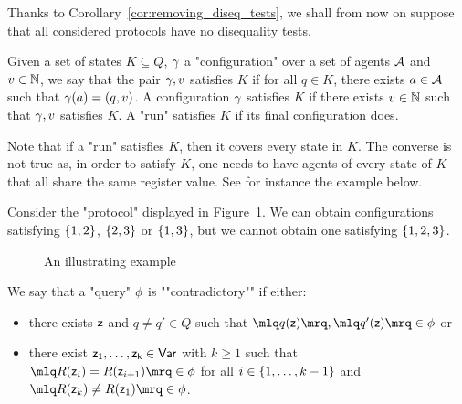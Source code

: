 Thanks to Corollary~\ref{cor:removing_diseq_tests}, we shall from now on suppose that all considered protocols have no disequality tests. 

\begin{definition}
	Given a set of states $K \subseteq Q$, $\gamma$ a "configuration" over a set of agents $\mathcal{A}$ and $v \in \mathbb{N}$, we say that the pair $\gamma, v$ satisfies $K$ if for all $q \in K$, there exists $a \in \mathcal{A}$ such that $\gamma(a) = (q,v)$.
	A configuration $\gamma$ satisfies $K$ if there exists $v \in \mathbb{N}$ such that $\gamma, v $ satisfies $K$. 
	A "run" satisfies $K$ if its final configuration does.
\end{definition}
Note that if a "run" satisfies $K$, then it covers every state in $K$. The converse is not true as, in order to satisfy $K$, one needs to have agents of every state of $K$ that all share the same register value. See for instance the example below.

\begin{ex}
	Consider the "protocol" displayed in Figure~\ref{fig:no-clique}.
	We can obtain configurations satisfying $\{1,2\}$, $\{2,3\}$ or $\{1,3\}$, but we cannot obtain one satisfying $\{1,2,3\}$.
	
	\begin{figure}[h]
		
		\caption{An illustrating example}
		\label{fig:no-clique}
	\end{figure}
\end{ex}



\begin{definition}
We say that a "query" $\phi$ is ""contradictory"" if either:
	\begin{itemize}
		\item there exists $\mathsf{z}$ and $q \neq q' \in Q$ such that $\quotemarks{q(\varz)}, \quotemarks{q'(\varz)} \in \query$ or
		
		\item there exist $\mathsf{z_1}, \ldots, \mathsf{z_k} \in \mathsf{Var}$ with $k\geq 1$ such that $\quotemarks{R(\varz_{i}) = R(\varz_{i+1})} \in \query$ for all $i \in \{1,\ldots,k-1\}$ and $\quotemarks{R(\varz_k) \neq R(\varz_1)} \in \query$.
	\end{itemize}
\end{definition}

